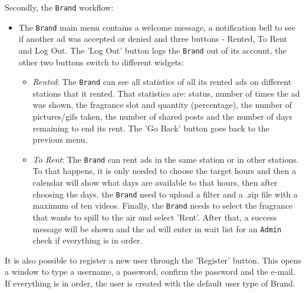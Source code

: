 Secondly, the \texttt{Brand} workflow:
\begin{itemize}
\item The \texttt{Brand} main menu contains a welcome message, a notification bell to see if another ad was accepted or denied and three buttons - Rented, To Rent and Log Out.
The 'Log Out' button logs the \texttt{Brand} out of its account, the other two buttons switch to different widgets:
%
\begin{itemize}
\item \emph{Rented}: The \texttt{Brand} can see all statistics of all its rented ads on different stations that it rented.
That statistics are: status, number of times the ad was shown, the fragrance slot and quantity (percentage), the number of pictures/\gls{gif}s taken, the number of shared posts and the number of days remaining to end its rent.
The 'Go Back' button goes back to the previous menu.
\item \emph{To Rent}: The \texttt{Brand} can rent ads in the same station or in other stations.
To that happens, it is only needed to choose the target hours and then a calendar will show what days are available to that hours, then after choosing the days, the \texttt{Brand} need to upload a filter and a .zip file with a maximum of ten videos. 
Finally, the \texttt{Brand} needs to select the fragrance that wants to spill to the air and select 'Rent'. After that, a success message will be shown and the ad will enter in wait list for an \texttt{Admin} check if everything is in order.
\end{itemize}
%
\end{itemize}

It is also possible to register a new user through the 'Register' button.
This opens a window to type a username, a password, confirm the password and the e-mail.
If everything is in order, the user is created with the default user type of Brand.

